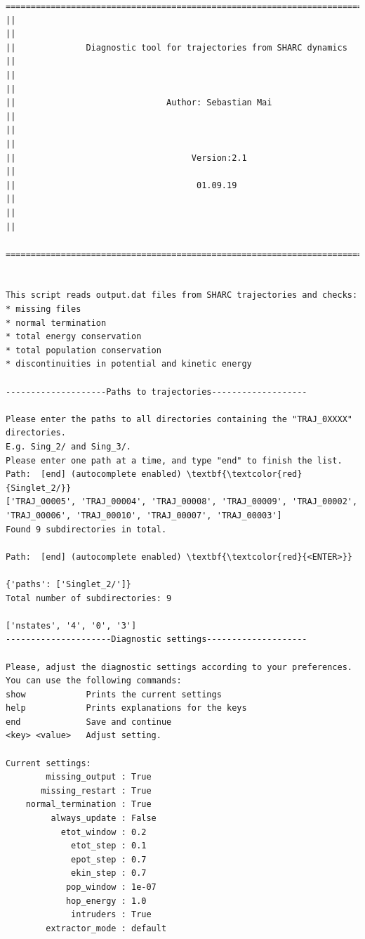 \documentclass[a4paper,11pt,DIV=15,openany]{scrbook}
\begin{document}
\begin{oframed}
\footnotesize\begin{Verbatim}[commandchars=\\\{\}]
  ================================================================================
||                                                                                ||
||              Diagnostic tool for trajectories from SHARC dynamics              ||
||                                                                                ||
||                              Author: Sebastian Mai                             ||
||                                                                                ||
||                                   Version:2.1                                  ||
||                                    01.09.19                                    ||
||                                                                                ||
  ================================================================================


This script reads output.dat files from SHARC trajectories and checks:
* missing files
* normal termination
* total energy conservation
* total population conservation
* discontinuities in potential and kinetic energy
  
--------------------Paths to trajectories-------------------

Please enter the paths to all directories containing the "TRAJ_0XXXX" directories.
E.g. Sing_2/ and Sing_3/. 
Please enter one path at a time, and type "end" to finish the list.
Path:  [end] (autocomplete enabled) \textbf{\textcolor{red}{Singlet_2/}}
['TRAJ_00005', 'TRAJ_00004', 'TRAJ_00008', 'TRAJ_00009', 'TRAJ_00002', 
'TRAJ_00006', 'TRAJ_00010', 'TRAJ_00007', 'TRAJ_00003']
Found 9 subdirectories in total.

Path:  [end] (autocomplete enabled) \textbf{\textcolor{red}{<ENTER>}}

{'paths': ['Singlet_2/']}
Total number of subdirectories: 9

['nstates', '4', '0', '3']
---------------------Diagnostic settings--------------------

Please, adjust the diagnostic settings according to your preferences.
You can use the following commands:
show            Prints the current settings
help            Prints explanations for the keys
end             Save and continue
<key> <value>   Adjust setting.

Current settings:
        missing_output : True
       missing_restart : True
    normal_termination : True
         always_update : False
           etot_window : 0.2
             etot_step : 0.1
             epot_step : 0.7
             ekin_step : 0.7
            pop_window : 1e-07
            hop_energy : 1.0
             intruders : True
        extractor_mode : default


\end{Verbatim}
\end{oframed}
\end{document}
